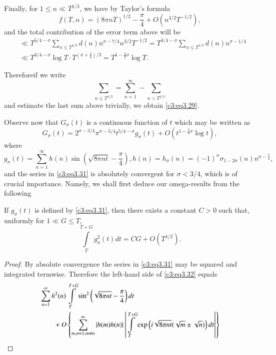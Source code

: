 Finally, for $1\leq n \ll T^{1/3}$, we have by Taylor's formula
$$
f(T, n)= (8 \pi n T)^{1/2} - \frac{\pi}{4} + O\left(n^{3/2}T^{-1/2} \right),
$$
and the total contribution of the error term above will be
\begin{align*}
  & \ll T^{5/4-\sigma} \sum_{n \leq T^{1/3}} d(n) n^{\sigma-
    7/4}n^{3/2}T^{-1/2} = T^{3/4-\sigma} \sum_{n \leq T^{1/3}} d(n)
  n^{\sigma-1/4}\\
  & \ll T^{3/4-\sigma} \log T\cdot T^{(\sigma+ \frac{3}{4})/3}= T^{1-
    \frac{3}{2}\sigma} \log T.  
\end{align*}

Therefore\pageoriginale if we write
$$
\sum_{n \leq T^{1/3}} = \sum_{n=1}^\infty - \sum_{n > T^{1/3}}
$$
and estimate the last sum above trivially, we obtain
\eqref{c3:eq3.29}.

Observe now that $G_\sigma(t)$ is a continuous function of $t$ which
may be written as 
\begin{equation}
  G_\sigma (t)  = 2^{\sigma- 3/4} \pi^{\sigma-
    5/4}t^{5/4-\sigma}g_{\sigma}(t) + O \left(t^{1- \frac{2}{3}\sigma}
  \log t\right),\label{c3:eq3.30}
\end{equation}
where
{\fontsize{10pt}{12pt}\selectfont
\begin{equation}
  g_\sigma (t)  = \sum_{n=1}^\infty h(n) \sin \left(\sqrt{8 \pi n t}-
  \frac{\pi}{4}\right), h(n) = h_\sigma(n) = (-1)^n \sigma_{1-
    2\sigma} (n) n^{\sigma- \frac{7}{4}},\label{c3:eq3.31} 
\end{equation}}
and the series in \eqref{c3:eq3.31} is absolutely convergent for
$\sigma< 3/4$, which is of crucial importance. Namely, we shall first
deduce our omega-results from the following

\begin{lemma}\label{c3:lem3.3}
  If $g_\sigma(t)$ is defined by \eqref{c3:eq3.31}, then there exists
  a constant $C> 0$ such that, uniformly for $1 \ll G \leq T$, 
  \begin{equation}
    \int\limits_T^{T+G} g^2_\sigma(t) dt = CG + O
    (T^{1/2}). \label{c3:eq3.32} 
  \end{equation}
\end{lemma}

\begin{proof}
  By absolute convergence the series in \eqref{c3:eq3.31} may be
  squared and integrated termwise. Therefore the left-hand side of
  \eqref{c3:eq3.32} equals
  \begin{align}
    & \sum_{n=1}^\infty h^2 (n) \int\limits_T^{T+G}\sin^2 \left(\sqrt{8
      \pi n t}- \frac{\pi}{4} \right)dt\label{c3:eq3.33}\\
    &\qquad +O \left\{\sum_{m, n =1; m\neq n}^\infty |h(m) h(n)|\left|
    \int\limits_T^{T+G} \exp \left(i \sqrt{8 \pi nt}(\sqrt{m}\pm
    \sqrt{n})  \right)dt\right|  \right\}\notag
  \end{align}
\end{proof}

